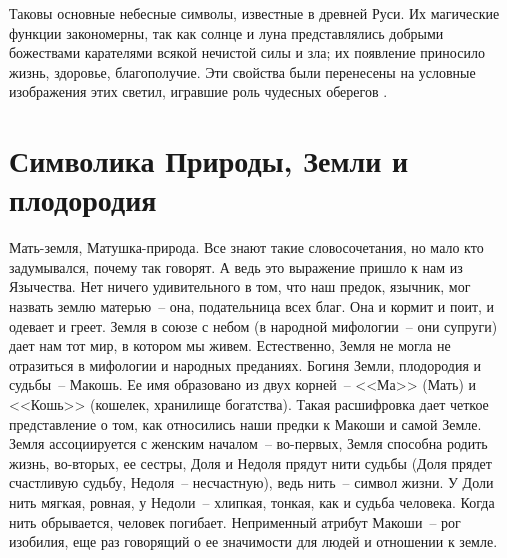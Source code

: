 \documentclass[pscyr,titlepage,chapters]{hedreport}
\begin{document}
  Таковы основные небесные символы, известные в древней Руси. Их магические
  функции закономерны, так как солнце и луна представлялись добрыми божествами
  карателями всякой нечистой силы и зла; их появление приносило жизнь, здоровье,
  благополучие. Эти свойства были перенесены на условные изображения этих
  светил, игравшие роль чудесных оберегов \cite{1}.

  \chapter{Символика Природы, Земли и плодородия}

  Мать-земля, Матушка-природа. Все знают такие словосочетания, но мало кто
  задумывался, почему так говорят. А ведь это выражение пришло к нам из
  Язычества. Нет ничего удивительного в том, что наш предок, язычник, мог
  назвать землю матерью~-- она, подательница всех благ. Она и кормит и поит, и
  одевает и греет. Земля в союзе с небом (в народной мифологии~-- они супруги)
  дает нам тот мир, в котором мы живем. Естественно, Земля не могла не
  отразиться в мифологии и народных преданиях. Богиня Земли, плодородия и
  судьбы~-- Макошь. Ее имя образовано из двух корней~-- <<Ма>> (Мать) и <<Кошь>>
  (кошелек, хранилище богатства). Такая расшифровка дает четкое представление о
  том, как относились наши предки к Макоши и самой Земле. Земля ассоциируется с
  женским началом~-- во-первых, Земля способна родить жизнь, во-вторых, ее
  сестры, Доля и Недоля прядут нити судьбы (Доля прядет счастливую судьбу,
  Недоля~-- несчастную), ведь нить~-- символ жизни. У Доли нить мягкая, ровная,
  у Недоли~-- хлипкая, тонкая, как и судьба человека. Когда нить обрывается,
  человек погибает. Неприменный атрибут Макоши~-- рог изобилия, еще раз
  говорящий о ее значимости для людей и отношении к земле.
\end{document}
